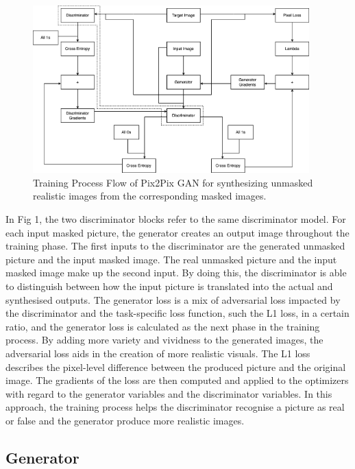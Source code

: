 \documentclass{36_styles/svproc}
\begin{document}
\begin{figure}[ht]%
\centering
\includegraphics[width=0.95\textwidth]{36_figures/training.png}
\caption{Training Process Flow of Pix2Pix GAN for synthesizing unmasked realistic images from the corresponding masked images.}\label{fig1}
\end{figure}

In Fig 1, the two discriminator blocks refer to the same discriminator model. For each input masked picture, the generator creates an output image throughout the training phase. The first inputs to the discriminator are the generated unmasked picture and the input masked image. The real unmasked picture and the input masked image make up the second input. By doing this, the discriminator is able to distinguish between how the input picture is translated into the actual and synthesised outputs. The generator loss is a mix of adversarial loss impacted by the discriminator and the task-specific loss function, such the L1 loss, in a certain ratio, and the generator loss is calculated as the next phase in the training process. By adding more variety and vividness to the generated images, the adversarial loss aids in the creation of more realistic visuals. The L1 loss describes the pixel-level difference between the produced picture and the original image. The gradients of the loss are then computed and applied to the optimizers with regard to the generator variables and the discriminator variables. In this approach, the training process helps the discriminator recognise a picture as real or false and the generator produce more realistic images.

\subsection{Generator}
\end{document}
